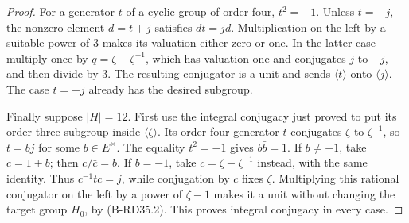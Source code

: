 \begin{proof}
For a generator $t$ of a cyclic group of order four, $t^2=-1$.
Unless $t=-j$, the nonzero element $d=t+j$ satisfies $dt=jd$.
Multiplication on the left by a suitable power of $3$ makes its
valuation either zero or one. In the latter case multiply once by
$q=\zeta-\zeta^{-1}$, which has valuation one and conjugates
$j$ to $-j$, and then divide by $3$. The resulting conjugator is
a unit and sends $\langle t\rangle$ onto $\langle j\rangle$.
The case $t=-j$ already has the desired subgroup.

Finally suppose $|H|=12$. First use the integral conjugacy just
proved to put its order-three subgroup inside $\langle\zeta\rangle$.
Its order-four generator $t$ conjugates $\zeta$ to $\zeta^{-1}$,
so $t=bj$ for some $b\in E^\times$. The equality $t^2=-1$ gives
$b\bar b=1$. If $b\ne-1$, take $c=1+b$; then $c/\bar c=b$.
If $b=-1$, take $c=\zeta-\zeta^{-1}$ instead, with the same
identity. Thus $c^{-1}tc=j$, while conjugation by $c$ fixes
$\zeta$. Multiplying this rational conjugator on the left by a
power of $\zeta-1$ makes it a unit without changing the target
group $H_0$, by (B-RD35.2). This proves integral conjugacy in
every case.
\end{proof}

